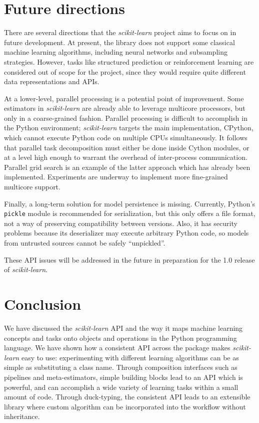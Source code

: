 \documentclass[twocolumn]{article}
\newcommand{\sklearn}{\textit{scikit-learn}\xspace}
\begin{document}
\section{Future directions}
\label{sec:future_work}
There are several directions that the \sklearn project
aims to focus on in future development.
At present, the library does not support some classical machine learning
algorithms,
including neural networks and subsampling strategies.
However, tasks like structured prediction or reinforcement learning are
considered out of scope for the project,
since they would require quite different data representations and APIs.

At a lower-level, parallel processing is a potential point of improvement.
Some estimators in \sklearn are already able to leverage multicore processors,
but only in a coarse-grained fashion.
Parallel processing is difficult to accomplish in the Python environment;
\sklearn targets the main implementation, CPython,
which cannot execute Python code on multiple CPUs simultaneously.
It follows that parallel task decomposition must either be done
inside Cython modules,
or at a level high enough to warrant the overhead
of inter-process communication.
Parallel grid search is an example of the latter approach
which has already been implemented.
Experiments are underway to implement more fine-grained multicore support.

Finally, a long-term solution for model persistence is missing.
Currently, Python's \texttt{pickle} module is recommended for serialization,
but this only offers a file format,
not a way of preserving compatibility between versions.
Also, it has security problems because its deserializer
may execute arbitrary Python code,
so models from untrusted sources cannot be safely ``unpickled''.

These API issues will be addressed in the future in preparation for
the 1.0 release of \sklearn.


\section{Conclusion}
\label{sec:conclusions}

We have discussed the \sklearn API
and the way it maps machine learning concepts and tasks
onto objects and operations in the Python programming language.
We have shown how a consistent API across the package makes \sklearn
easy to use: experimenting with different learning
algorithms can be as simple as substituting a class name.
Through composition interfaces such as pipelines and meta-estimators,
simple building blocks lead to an API which is powerful,
and can accomplish a wide variety of learning tasks
within a small amount of code.
Through duck-typing, the consistent API leads to an extensible library
where custom algorithm can be incorporated into the workflow without inheritance.
\end{document}

